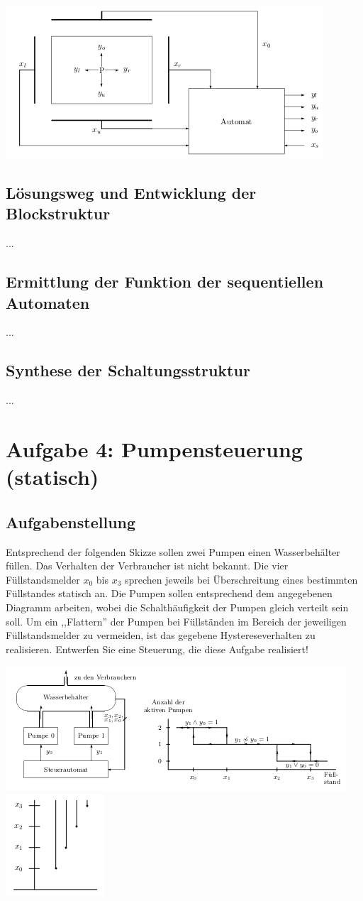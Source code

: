 \documentclass[a4paper,12pt,titlepage]{scrartcl}
\begin{document}
\begin{center}
    \includegraphics[width=.6\linewidth]{Assets/Schaltsysteme-praktika-v3.png}
\end{center}

\subsection*{Lösungsweg und Entwicklung der Blockstruktur}
...
\subsection*{Ermittlung der Funktion der sequentiellen Automaten}
...
\subsection*{Synthese der Schaltungsstruktur}
...
\newpage

\section*{Aufgabe 4: Pumpensteuerung (statisch)}
\subsection*{Aufgabenstellung}
Entsprechend der folgenden Skizze sollen zwei Pumpen einen Wasserbehälter füllen. Das Verhalten der Verbraucher ist nicht bekannt.
Die vier Füllstandsmelder $x_0$ bis $x_3$ sprechen jeweils bei Überschreitung eines bestimmten Füllstandes statisch an.
Die Pumpen sollen entsprechend dem angegebenen Diagramm arbeiten, wobei die Schalthäufigkeit der Pumpen gleich verteilt sein soll. Um ein ,,Flattern'' der Pumpen bei Füllständen im Bereich der jeweiligen Füllstandsmelder zu vermeiden, ist das gegebene Hystereseverhalten zu realisieren.
Entwerfen Sie eine Steuerung, die diese Aufgabe realisiert!

\begin{center}
\includegraphics[width=.5\linewidth]{Assets/Schaltsysteme-praktika-v4.png}
\includegraphics[width=.15\linewidth]{Assets/Schaltsysteme-praktika-v4-2.png}
\end{center}
\end{document}
